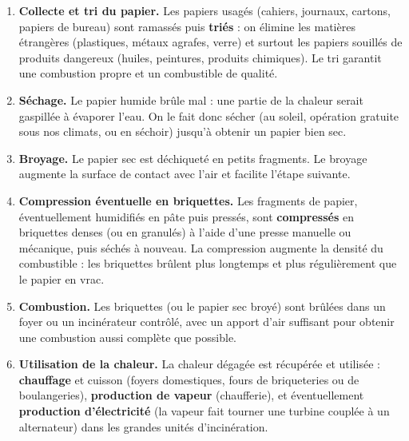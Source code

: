 \documentclass[11pt]{article}
\begin{document}
\begin{enumerate}
\item \textbf{Collecte et tri du papier.} Les papiers usagés (cahiers, journaux, cartons, papiers de bureau) sont ramassés puis \textbf{triés} : on élimine les matières étrangères (plastiques, métaux agrafes, verre) et surtout les papiers souillés de produits dangereux (huiles, peintures, produits chimiques). Le tri garantit une combustion propre et un combustible de qualité.
\item \textbf{Séchage.} Le papier humide brûle mal : une partie de la chaleur serait gaspillée à évaporer l'eau. On le fait donc sécher (au soleil, opération gratuite sous nos climats, ou en séchoir) jusqu'à obtenir un papier bien sec.
\item \textbf{Broyage.} Le papier sec est déchiqueté en petits fragments. Le broyage augmente la surface de contact avec l'air et facilite l'étape suivante.
\item \textbf{Compression éventuelle en briquettes.} Les fragments de papier, éventuellement humidifiés en pâte puis pressés, sont \textbf{compressés} en briquettes denses (ou en granulés) à l'aide d'une presse manuelle ou mécanique, puis séchés à nouveau. La compression augmente la densité du combustible : les briquettes brûlent plus longtemps et plus régulièrement que le papier en vrac.
\item \textbf{Combustion.} Les briquettes (ou le papier sec broyé) sont brûlées dans un foyer ou un incinérateur contrôlé, avec un apport d'air suffisant pour obtenir une combustion aussi complète que possible.
\item \textbf{Utilisation de la chaleur.} La chaleur dégagée est récupérée et utilisée : \textbf{chauffage} et cuisson (foyers domestiques, fours de briqueteries ou de boulangeries), \textbf{production de vapeur} (chaufferie), et éventuellement \textbf{production d'électricité} (la vapeur fait tourner une turbine couplée à un alternateur) dans les grandes unités d'incinération.
\end{enumerate}
\end{document}
